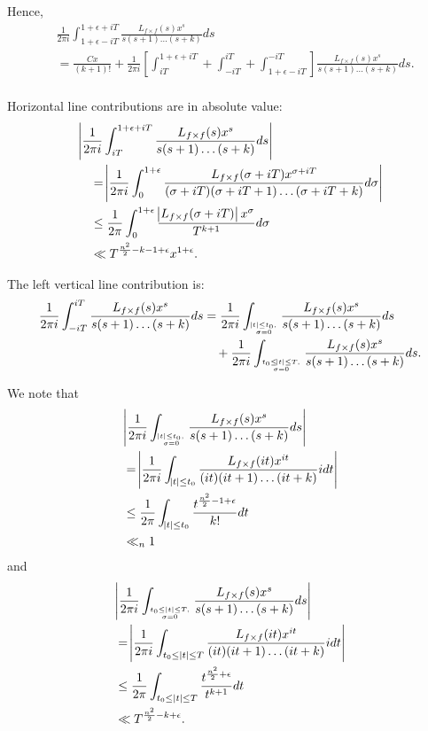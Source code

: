 \documentclass[sn-mathphys,Numbered]{sn-jnl}
\theoremstyle{thmstyleone}%
\theoremstyle{thmstyletwo}%
\theoremstyle{thmstylethree}%
\begin{document}
\noindent
Hence,
\begin{align*}
&\frac{1}{2 \pi i} \int_{1+\epsilon-iT}^{1+\epsilon+iT} \frac{L_{f \times f}(s)x^s}{s(s+1)\dots (s+k)} ds \\
&= \frac{Cx}{(k+1)!} + \frac{1}{2 \pi i} \left[ \int_{iT}^{1+\epsilon+iT} + \int_{-iT}^{iT} + \int_{1+\epsilon-iT}^{-iT} \right] \frac{L_{f \times f}(s)x^s}{s(s+1)\dots (s+k)} ds . \\
\end{align*}

\noindent
Horizontal line contributions are in absolute value:
\begin{align*}
&\abs{ \frac{1}{2 \pi i} \int_{iT}^{1+\epsilon+iT} \frac{L_{f \times f}(s)x^s}{s(s+1)\dots (s+k)} ds } \\
&\quad= \abs{ \frac{1}{2 \pi i} \int_0^{1+\epsilon} \frac{L_{f \times f}(\sigma+iT)x^{\sigma+iT}}{(\sigma+iT)(\sigma+iT+1)\dots (\sigma+iT+k)} d\sigma } \\
&\quad \leq \frac{1}{2 \pi} \int_0^{1+\epsilon} \frac{\abs{L_{f \times f}(\sigma+iT)}x^{\sigma}}{T^{k+1}} d\sigma \\
&\quad \ll T^{\frac{n^2}{2}-k-1+\epsilon}x^{1+\epsilon} . \\
\end{align*}

\noindent
The left vertical line contribution is:
\begin{align*}
\frac{1}{2 \pi i} \int_{-iT}^{iT} \frac{L_{f \times f}(s)x^s}{s(s+1)\dots (s+k)} ds &=  \frac{1}{2 \pi i} \int_{\abs{t} \leq t_0, \atop \sigma=0} \frac{L_{f \times f}(s)x^s}{s(s+1)\dots (s+k)} ds \\
& \quad + \frac{1}{2 \pi i} \int_{t_0 \leq \abs{t} \leq T, \atop \sigma = 0} \frac{L_{f \times f}(s)x^s}{s(s+1)\dots (s+k)} ds.\\
\end{align*}

\noindent
We note that
\begin{align*}
&\abs{ \frac{1}{2 \pi i} \int_{\abs{t} \leq t_0, \atop \sigma =0} \frac{L_{f \times f}(s)x^s}{s(s+1)\dots (s+k)} ds } \\
&= \abs{ \frac{1}{2 \pi i} \int_{\abs{t} \leq t_0} \frac{L_{f \times f} (it) x^{it}}{ (it) (it+1) \dots ( it+k)} i dt } \\
& \leq \frac{1}{2 \pi} \int_{\abs{t} \leq t_0} \frac{t^{\frac{n^2}{2}-1+\epsilon}}{k!} dt \\
& \ll_n 1
\end{align*}
and
\begin{align*}
&\abs{ \frac{1}{2 \pi i} \int_{t_0 \leq \, \abs{t} \leq T, \atop \sigma = 0} \frac{L_{f \times f}(s)x^s}{s(s+1)\dots (s+k)} ds } \\
&= \abs{ \frac{1}{2 \pi i} \int_{t_0 \leq \, \abs{t} \leq T} \frac{L_{f \times f} (it) x^{it}}{(it) (it+1) \dots (it+k)} i dt } \\
& \leq \frac{1}{2 \pi} \int_{t_0 \leq \, \abs{t} \leq T} \frac{t^{\frac{n^2}{2}+\epsilon}}{t^{k+1}} dt \\
& \ll T^{\frac{n^2}{2} - k +\epsilon}. \\
\end{align*}
\end{document}

